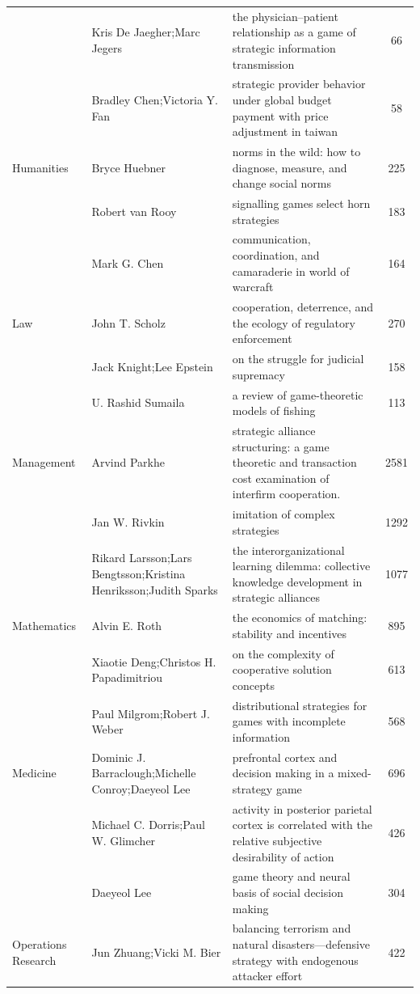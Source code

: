 \documentclass[
  12pt,
]{article}
\begin{document}
\begin{longtable}[t]{|>{\raggedright\arraybackslash}p{4cm}>{\raggedright\arraybackslash}p{4cm}>{\raggedright\arraybackslash}p{4cm}>{}c|}
 & Kris De Jaegher;Marc Jegers & the physician–patient relationship as a game of strategic information transmission & 66\\
 & Bradley Chen;Victoria Y. Fan & strategic provider behavior under global budget payment with price adjustment in taiwan & 58\\
Humanities & Bryce Huebner & norms in the wild: how to diagnose, measure, and change social norms & 225\\
 & Robert van Rooy & signalling games select horn strategies & 183\\
 & Mark G. Chen & communication, coordination, and camaraderie in world of warcraft & 164\\
Law & John T. Scholz & cooperation, deterrence, and the ecology of regulatory enforcement & 270\\
 & Jack Knight;Lee Epstein & on the struggle for judicial supremacy & 158\\
 & U. Rashid Sumaila & a review of game-theoretic models of fishing & 113\\
Management & Arvind Parkhe & strategic alliance structuring: a game theoretic and transaction cost examination of interfirm cooperation. & 2581\\
 & Jan W. Rivkin & imitation of complex strategies & 1292\\
 & Rikard Larsson;Lars Bengtsson;Kristina Henriksson;Judith Sparks & the interorganizational learning dilemma: collective knowledge development in strategic alliances & 1077\\
Mathematics & Alvin E. Roth & the economics of matching: stability and incentives & 895\\
 & Xiaotie Deng;Christos H. Papadimitriou & on the complexity of cooperative solution concepts & 613\\
 & Paul Milgrom;Robert J. Weber & distributional strategies for games with incomplete information & 568\\
Medicine & Dominic J. Barraclough;Michelle Conroy;Daeyeol Lee & prefrontal cortex and decision making in a mixed-strategy game & 696\\
 & Michael C. Dorris;Paul W. Glimcher & activity in posterior parietal cortex is correlated with the relative subjective desirability of action & 426\\
 & Daeyeol Lee & game theory and neural basis of social decision making & 304\\
Operations Research & Jun Zhuang;Vicki M. Bier & balancing terrorism and natural disasters—defensive strategy with endogenous attacker effort & 422\\

\end{longtable}
\end{document}
